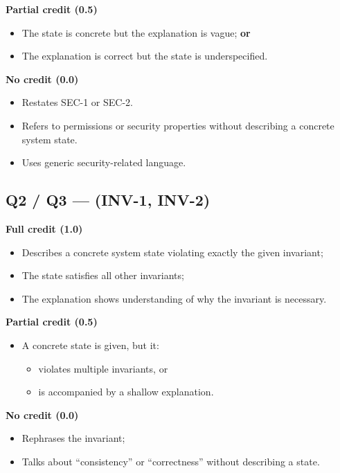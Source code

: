 \documentclass{article} %
\begin{document}
\noindent
\textbf{Partial credit (0.5)}
\begin{itemize}
  \item The state is concrete but the explanation is vague; \textbf{or}
  \item The explanation is correct but the state is underspecified.
\end{itemize}

\noindent
\textbf{No credit (0.0)}
\begin{itemize}
\item Restates SEC-1 or SEC-2.
\item Refers to permissions or security properties without describing a concrete system state.
  \item Uses generic security-related language.
\end{itemize}

\bigskip

\subsection*{Q2 / Q3 --- (INV-1, INV-2)}

\noindent
\textbf{Full credit (1.0)}
\begin{itemize}
  \item Describes a concrete system state violating exactly the given invariant;
  \item The state satisfies all other invariants;
  \item The explanation shows understanding of why the invariant is necessary.
\end{itemize}

\noindent
\textbf{Partial credit (0.5)}
\begin{itemize}
  \item A concrete state is given, but it:
    \begin{itemize}
      \item violates multiple invariants, or
      \item is accompanied by a shallow explanation.
    \end{itemize}
\end{itemize}

\noindent
\textbf{No credit (0.0)}
\begin{itemize}
  \item Rephrases the invariant;
  \item Talks about ``consistency'' or ``correctness'' without describing a state.
\end{itemize}
\end{document}
